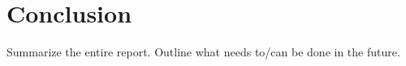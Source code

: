 \section{Conclusion}
Summarize the entire report.
Outline what needs to/can be done in the future.

